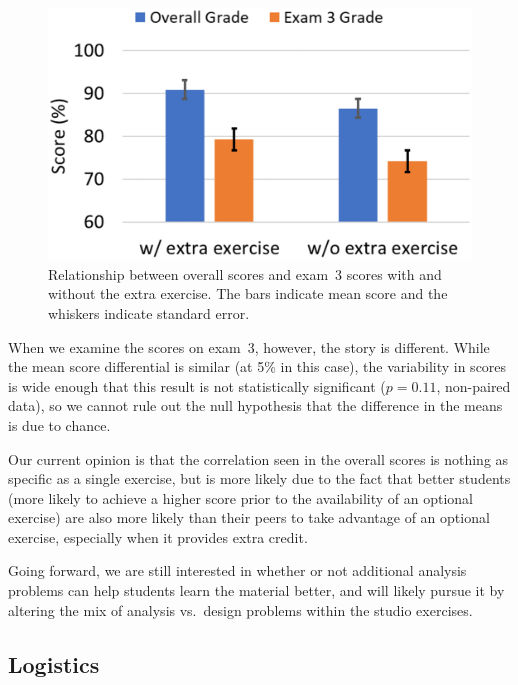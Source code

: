 \begin{figure}[ht]
\centering
\includegraphics[width=\columnwidth]{scores}
\caption{Relationship between overall scores and exam~3 scores
with and without the extra exercise. The bars indicate mean score and
the whiskers indicate standard error.}
\label{fig:scores}
\end{figure}

When we examine the scores on exam~3, however, the story is different.
While the mean score differential is similar (at 5\% in this case), the
variability in scores is wide enough that this result is not
statistically significant ($p = 0.11$, non-paired data), so we cannot
rule out the null hypothesis that the difference in the means is
due to chance.

Our current opinion is that the correlation seen in the overall scores
is nothing as specific as a single exercise, but is more likely due to the
fact that better students (more likely to achieve a higher score prior
to the availability of an optional exercise) are also more likely than
their peers to take advantage of an optional exercise, especially when
it provides extra credit.

Going forward, we are still interested in whether or not additional
analysis problems can help students learn the material better, and will
likely pursue it by altering the mix of analysis vs.~design problems
within the studio exercises.

\subsection{Logistics}


